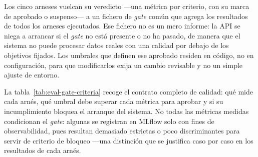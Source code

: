 Los cinco arneses vuelcan su veredicto —una métrica por criterio, con su marca de aprobado o
suspenso— a un fichero de \textit{gate} común que agrega los resultados de todos los arneses
ejecutados. Ese fichero no es un mero informe: la \ac{API} se niega a arrancar si el \textit{gate}
no está presente o no ha pasado, de manera que el sistema no puede procesar datos reales con
una calidad por debajo de los objetivos fijados. Los umbrales que definen ese aprobado residen
en código, no en configuración, para que modificarlos exija un cambio revisable y no un simple
ajuste de entorno.

La tabla~\ref{tab:eval-gate-criteria} recoge el contrato completo de calidad: qué mide cada arnés,
qué umbral debe superar cada métrica para aprobar y si su incumplimiento bloquea el arranque del
sistema. No todas las métricas medidas condicionan el \textit{gate}: algunas se registran en
MLflow solo con fines de observabilidad, pues resultan demasiado estrictas o poco discriminantes
para servir de criterio de bloqueo —una distinción que se justifica caso por caso en los
resultados de cada arnés.

